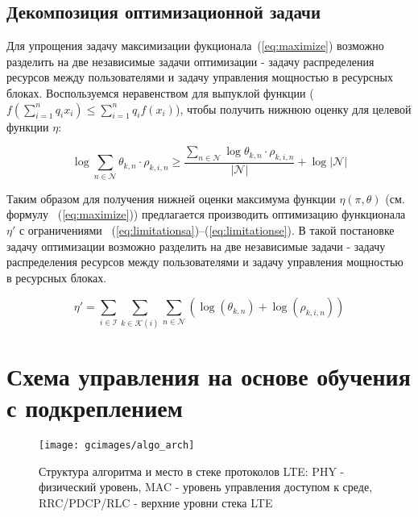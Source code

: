 \subsection{Декомпозиция оптимизационной задачи}
Для упрощения задачу максимизации фукционала~(\ref{eq:maximize}) возможно разделить на две независимые задачи оптимизации - задачу распределения ресурсов между пользователями и задачу управления мощностью в ресурсных блоках. Воспользуемся неравенством для выпуклой функции ($f\left(\sum _{{i=1}}^{{n}}q_{i}x_{i}\right)\leq \sum _{{i=1}}^{{n}}q_{i}f(x_{i})$), чтобы получить нижнюю оценку для целевой функции $\eta$:

\begin{equation}
    \label{eq:jensen}
    \log{\sum_{n \in \mathcal{N}} \theta_{k,n} \cdot \rho_{k,i,n}} \geq \frac{\sum_{n \in \mathcal{N}} \log{\theta_{k,n} \cdot \rho_{k,i,n}}}{|\mathcal{N}|} + \log{|\mathcal{N}|}
\end{equation}

Таким образом для получения нижней оценки максимума функции $\eta(\pi, \theta)$ (см. формулу ~(\ref{eq:maximize})) предлагается производить оптимизацию функционала $\eta'$ с ограничениями ~(\ref{eq:limitationsa})--(\ref{eq:limitationse}). В такой постановке задачу оптимизации возможно разделить на две независимые задачи - задачу распределения ресурсов между пользователями и задачу управления мощностью в ресурсных блоках.

\begin{equation}
\label{eq:maximizealt}
\eta' = \sum_{i \in \mathcal{I}} \sum_{k \in \mathcal{K}(i)} \sum_{n \in \mathcal{N}} (\log(\theta_{k,n}) + \log( \rho_{k,i,n}))
\end{equation}

\section{Схема управления на основе обучения с подкреплением}
\begin{figure}
    \centering
    \texttt{[image: gcimages/algo\_arch]}
    \caption{Структура алгоритма и место в стеке протоколов LTE: PHY - физический уровень, MAC - уровень управления доступом к среде, RRC/PDCP/RLC - верхние уровни стека LTE}
    \label{fig:algo_arch}
\end{figure}

